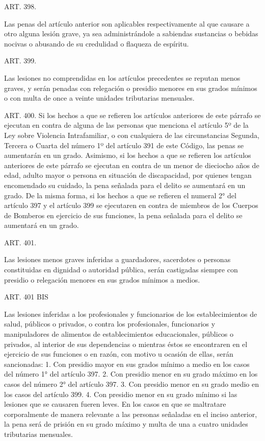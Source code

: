     ART. 398.

    Las penas del artículo anterior son aplicables respectivamente al que causare a otro alguna lesión grave, ya sea administrándole a sabiendas sustancias o bebidas nocivas o abusando de su credulidad o flaqueza de espíritu.



    ART. 399.

    Las lesiones no comprendidas en los artículos precedentes se reputan menos graves, y serán penadas con relegación o presidio menores en sus grados mínimos o con multa de once a veinte unidades tributarias mensuales.








    ART. 400.
    Si los hechos a que se refieren los artículos anteriores de este párrafo se ejecutan en contra de alguna de las personas que menciona el artículo 5º de la Ley sobre Violencia Intrafamiliar, o con cualquiera de las circunstancias Segunda, Tercera o Cuarta del número 1º del artículo 391 de este Código, las penas se aumentarán en un grado.
    Asimismo, si los hechos a que se refieren los artículos anteriores de este párrafo se ejecutan en contra de un menor de dieciocho años de edad, adulto mayor o persona en situación de discapacidad, por quienes tengan encomendado su cuidado, la pena señalada para el delito se aumentará en un grado.
    De la misma forma, si los hechos a que se refieren el numeral 2° del artículo 397 y el artículo 399 se ejecutaren en contra de miembros de los Cuerpos de Bomberos en ejercicio de sus funciones, la pena señalada para el delito se aumentará en un grado.




    ART. 401.

    Las lesiones menos graves inferidas a guardadores, sacerdotes o personas constituidas en dignidad o autoridad pública, serán castigadas siempre con presidio o relegación menores en sus grados mínimos a medios.




    ART. 401 BIS

    Las lesiones inferidas a los profesionales y funcionarios de los establecimientos de salud, públicos o privados, o contra los profesionales, funcionarios y manipuladores de alimentos de establecimientos educacionales, públicos o privados, al interior de sus dependencias o mientras éstos se encontraren en el ejercicio de sus funciones o en razón, con motivo u ocasión de ellas, serán sancionadas:
    1. Con presidio mayor en sus grados mínimo a medio en los casos del número 1° del artículo 397.
    2. Con presidio menor en su grado máximo en los casos del número 2° del artículo 397.
    3. Con presidio menor en su grado medio en los casos del artículo 399.
    4. Con presidio menor en su grado mínimo si las lesiones que se causaren fueren leves.
    En los casos en que se maltratare corporalmente de manera relevante a las personas señaladas en el inciso anterior, la pena será de prisión en su grado máximo y multa de una a cuatro unidades tributarias mensuales.



